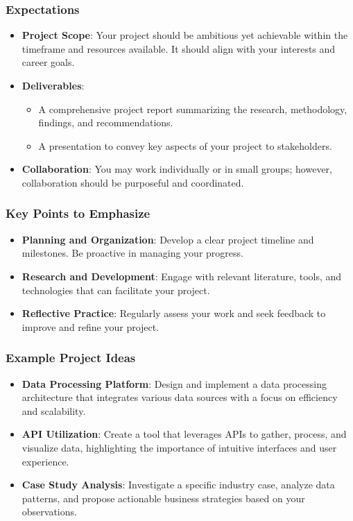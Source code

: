 \documentclass[aspectratio=169]{beamer}
\begin{document}
\begin{frame}[fragile]
    \frametitle{Expectations}
    \begin{itemize}
        \item \textbf{Project Scope}: Your project should be ambitious yet achievable within the timeframe and resources available. It should align with your interests and career goals.
        
        \item \textbf{Deliverables}:
        \begin{itemize}
            \item A comprehensive project report summarizing the research, methodology, findings, and recommendations.
            \item A presentation to convey key aspects of your project to stakeholders.
        \end{itemize}
        
        \item \textbf{Collaboration}: You may work individually or in small groups; however, collaboration should be purposeful and coordinated.
    \end{itemize}
\end{frame}

\begin{frame}[fragile]
    \frametitle{Key Points to Emphasize}
    \begin{itemize}
        \item \textbf{Planning and Organization}: Develop a clear project timeline and milestones. Be proactive in managing your progress.
        
        \item \textbf{Research and Development}: Engage with relevant literature, tools, and technologies that can facilitate your project.
        
        \item \textbf{Reflective Practice}: Regularly assess your work and seek feedback to improve and refine your project.
    \end{itemize}
\end{frame}

\begin{frame}[fragile]
    \frametitle{Example Project Ideas}
    \begin{itemize}
        \item \textbf{Data Processing Platform}: Design and implement a data processing architecture that integrates various data sources with a focus on efficiency and scalability.
        
        \item \textbf{API Utilization}: Create a tool that leverages APIs to gather, process, and visualize data, highlighting the importance of intuitive interfaces and user experience.
        
        \item \textbf{Case Study Analysis}: Investigate a specific industry case, analyze data patterns, and propose actionable business strategies based on your observations.
    \end{itemize}
\end{frame}
\end{document}
